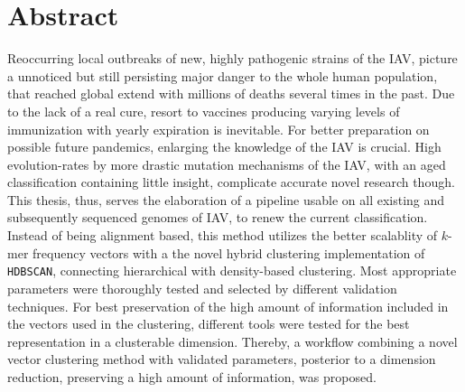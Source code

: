 \chapter*{Abstract}

Reoccurring local outbreaks of new, highly pathogenic strains of the \gls{IAV}, picture a unnoticed but still persisting major danger to the whole human population, that reached global extend with millions of deaths several times in the past. Due to the lack of a real cure, resort to vaccines producing varying levels of immunization with yearly expiration is inevitable. For better preparation on possible future pandemics, enlarging the knowledge of the \gls{IAV} is crucial. High evolution-rates by more drastic mutation mechanisms of the \gls{IAV}, with an aged classification containing little insight, complicate accurate novel research though. This thesis, thus, serves the elaboration of a pipeline usable on all existing and subsequently sequenced genomes of \gls{IAV}, to renew the current classification. Instead of being alignment based, this method utilizes the better scalablity of $k$-mer frequency vectors with a the novel hybrid clustering implementation of \texttt{HDBSCAN}, connecting hierarchical with density-based clustering. Most appropriate parameters were thoroughly tested and selected by different validation techniques. For best preservation of the high amount of information included in the vectors used in the clustering, different tools were tested for the best representation in a clusterable dimension. Thereby, a workflow combining a novel vector clustering method with validated parameters, posterior to a dimension reduction, preserving a high amount of information, was proposed. 